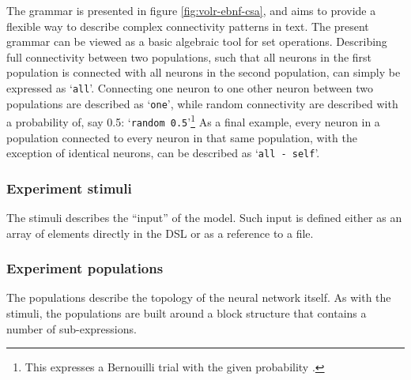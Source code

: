 \documentclass{report.tex}{subfiles}
\begin{document}
The grammar is presented in figure \ref{fig:volr-ebnf-csa}, and aims to provide
a flexible way to describe complex connectivity patterns in text.
The present grammar can be viewed as a basic algebraic tool for set operations.
Describing full connectivity between two populations, such that all neurons
in the first population is connected with all neurons in the second population,
can simply be expressed as `\texttt{all}'.
Connecting one neuron to one other neuron between two populations are described
as `\texttt{one}', while random connectivity are described with a probability
of, say 0.5: `\texttt{random 0.5}'\footnote{
  This expresses a Bernouilli trial with the given probability
  \autocite{Djurfeldt2012}.
}
As a final example, every neuron in a population connected to every neuron in
that same population, with the exception of identical neurons, can be described
as `\texttt{all - self}'.
%
%
%
%

\subsubsection{Experiment stimuli}
The stimuli describes the ``input'' of the model.
Such input is defined either as an array of elements directly in the DSL
or as a reference to a file.

\subsubsection{Experiment populations}
The populations describe the topology of the neural network itself.
As with the stimuli, the populations are built around a block structure that
contains a number of sub-expressions.
\end{document}
